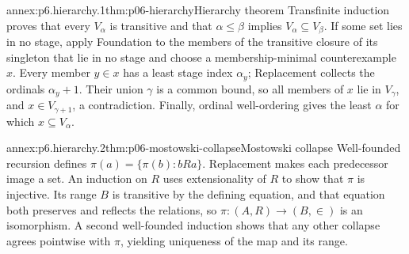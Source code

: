 \begin{annexitem}{annex:p6.hierarchy.1}{thm:p06-hierarchy}{Hierarchy theorem}
Transfinite induction proves that every \(V_\alpha\) is transitive and that
\(\alpha\leq\beta\) implies \(V_\alpha\subseteq V_\beta\).  If some set lies
in no stage, apply Foundation to the members of the transitive closure of its
singleton that lie in no stage and choose a membership-minimal counterexample
\(x\).  Every member \(y\in x\) has a least stage index \(\alpha_y\);
Replacement collects the ordinals \(\alpha_y+1\).  Their union \(\gamma\) is
a common bound, so all members of \(x\) lie in \(V_\gamma\), and
\(x\in V_{\gamma+1}\), a contradiction.  Finally, ordinal well-ordering gives
the least \(\alpha\) for which \(x\subseteq V_\alpha\).
\end{annexitem}

\begin{annexitem}{annex:p6.hierarchy.2}{thm:p06-mostowski-collapse}{Mostowski collapse}
Well-founded recursion defines
\(\pi(a)=\{\pi(b):bRa\}\).  Replacement makes each predecessor image a set.
An induction on \(R\) uses extensionality of \(R\) to show that \(\pi\) is
injective.  Its range \(B\) is transitive by the defining equation, and that
equation both preserves and reflects the relations, so
\(\pi:(A,R)\to(B,\in)\) is an isomorphism.  A second well-founded induction
shows that any other collapse agrees pointwise with \(\pi\), yielding
uniqueness of the map and its range.
\end{annexitem}
